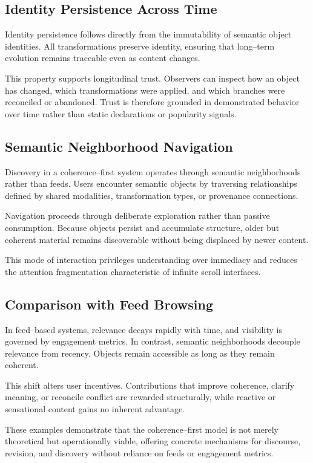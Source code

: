 \documentclass[11pt]{article}
\begin{document}
\subsection{Identity Persistence Across Time}

Identity persistence follows directly from the immutability of semantic object identities.
All transformations preserve identity, ensuring that long--term evolution remains
traceable even as content changes.

This property supports longitudinal trust. Observers can inspect how an object has
changed, which transformations were applied, and which branches were reconciled or
abandoned. Trust is therefore grounded in demonstrated behavior over time rather than
static declarations or popularity signals.

\subsection{Semantic Neighborhood Navigation}

Discovery in a coherence--first system operates through semantic neighborhoods rather than
feeds. Users encounter semantic objects by traversing relationships defined by shared
modalities, transformation types, or provenance connections.

Navigation proceeds through deliberate exploration rather than passive consumption.
Because objects persist and accumulate structure, older but coherent material remains
discoverable without being displaced by newer content.

This mode of interaction privileges understanding over immediacy and reduces the
attention fragmentation characteristic of infinite scroll interfaces.

\subsection{Comparison with Feed Browsing}

In feed--based systems, relevance decays rapidly with time, and visibility is governed by
engagement metrics. In contrast, semantic neighborhoods decouple relevance from recency.
Objects remain accessible as long as they remain coherent.

This shift alters user incentives. Contributions that improve coherence, clarify meaning,
or reconcile conflict are rewarded structurally, while reactive or sensational content
gains no inherent advantage.

These examples demonstrate that the coherence--first model is not merely theoretical but
operationally viable, offering concrete mechanisms for discourse, revision, and discovery
without reliance on feeds or engagement metrics.
\end{document}
